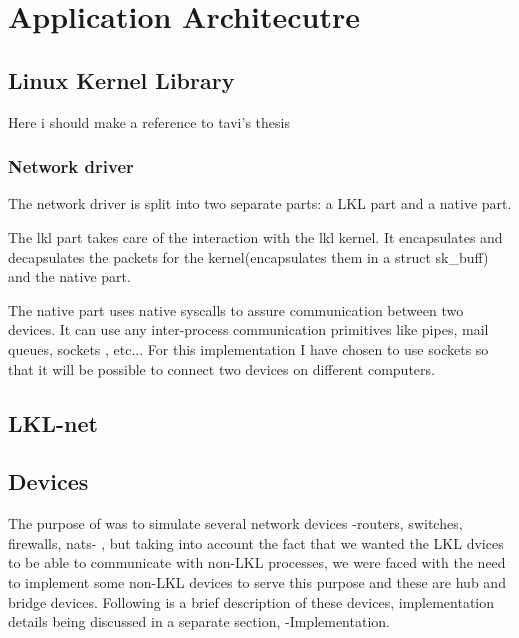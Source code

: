 \chapter{Application Architecutre}
\label{chapter:arch}

\section{Linux Kernel Library}
Here i should make a reference to tavi's thesis\cite{thesis}
\label{sec:lkl}

\subsection{Network driver}
\label{sec:net-driver}

The network driver is split into two separate parts: a LKL part and a native part.

The lkl part takes care of the interaction with the lkl kernel. It encapsulates
and decapsulates the packets for the kernel(encapsulates them in a struct sk_buff)
and the native part.

The native part uses native syscalls to assure communication between two devices.
It can use any inter-process communication primitives like pipes, mail queues, sockets
, etc... For this implementation I have chosen to use sockets so that it will be possible
to connect two devices on different computers.


\section{LKL-net}
\label{sec:lkl-net}


\section{Devices}
\label{sec:devices}
The purpose of \project was to simulate several network devices -routers, switches, firewalls, nats- , but taking into account the fact that we wanted the LKL dvices to be able to communicate with non-LKL processes, we were faced with the need to implement some non-LKL devices to serve this purpose and these are hub and bridge devices. Following is a brief description of these devices, implementation details being discussed in a separate section,  -Implementation.
